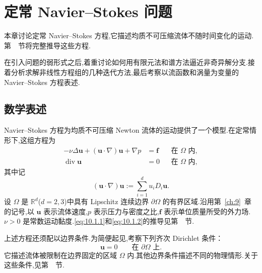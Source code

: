 \chapter{定常 Navier--Stokes 问题}\label{ch:10}

本章讨论定常 Navier--Stokes 方程,它描述均质不可压缩流体不随时间变化的运动.第~~节将完整推导这些方程.

在引入问题的弱形式之后,着重讨论如何用有限元法和谱方法逼近非奇异解分支.接着分析求解非线性方程组的几种迭代方法,最后考察以流函数和涡量为变量的 Navier--Stokes 方程表述.

\section{数学表述}\label{sec:10.1}

Navier--Stokes 方程为均质不可压缩 Newton 流体的运动提供了一个模型.在定常情形下,这组方程为
\begin{align}
  -\nu\Delta\boldsymbol{u}+(\boldsymbol{u}\cdot\nabla)\boldsymbol{u}+\nabla p
      &=\boldsymbol{f}&&\text{在 }\Omega\text{ 内},\label{eq:10.1.1}\\
  \operatorname{div}\boldsymbol{u}&=0&&\text{在 }\Omega\text{ 内},\label{eq:10.1.2}
\end{align}
其中记
\[
  (\boldsymbol{u}\cdot\nabla)\boldsymbol{u}:=\sum_{i=1}^d u_iD_i\boldsymbol{u}.
\]
设 \(\Omega\) 是 \(\mathbb R^d\)(\(d=2,3\))中具有 Lipschitz 连续边界 \(\partial\Omega\) 的有界区域.沿用第~\ref{ch:9}~章的记号,以 \(\boldsymbol{u}\) 表示流体速度,\(p\) 表示压力与密度之比,\(\boldsymbol{f}\) 表示单位质量所受的外力场.\(\nu>0\) 是常数运动黏度.\eqref{eq:10.1.1}和\eqref{eq:10.1.2}的推导见第~~节.

上述方程还须配以边界条件.为简便起见,考察下列齐次 Dirichlet 条件：
\begin{equation}\label{eq:10.1.3}
  \boldsymbol{u}=0\qquad\text{在 }\partial\Omega\text{ 上}.
\end{equation}
它描述流体被限制在边界固定的区域 \(\Omega\) 内.其他边界条件描述不同的物理情形.关于这些条件,见第~~节.

